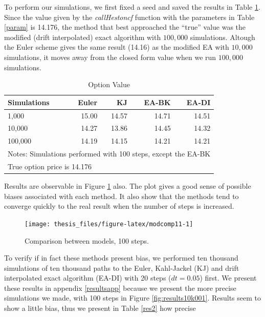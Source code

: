 \documentclass[12pt,oneside]{reedthesis}
\theoremstyle{definition}
\theoremstyle{definition}
\theoremstyle{remark}
\begin{document}
  To perform our simulations, we first fixed a seed and saved the results
  in Table \ref{res}. Since the value given by the \emph{callHestoncf}
  function with the parameters in Table \ref{param} is 14.176, the method
  that best approached the ``true'' value was the modified (drift
  interpolated) exact algorithm with \(100,000\) simulations. Altough the
  Euler scheme gives the same result (14.16) as the modified EA with
  \(10,000\) simulations, it moves away from the closed form value when we
  run \(100,000\) simulations.
  \begin{table}[ht]
  \centering
  \begin{tabular}{lrrrr}
    \hline 
  Simulations & Euler & KJ & EA-BK & EA-DI \\ 
    \hline 
  1,000 & 15.00 & 14.57 & 14.71 & 14.51 \\ 
    10,000 & 14.27 & 13.86 & 14.45 & 14.32 \\ 
    100,000 & 14.19 & 14.15 & 14.21 & 14.21 \\ 
     \hline 
  \multicolumn{5}{l}{\scriptsize{Notes: Simulations performed with 100 steps, except the EA-BK}} \\ 
   \multicolumn{5}{l}{\hspace{0.8cm} \scriptsize{True option price is 14.176}} 
  \end{tabular}
  \caption{Option Value} 
  \label{res}
  \end{table}
  Results are observable in Figure \ref{fig:modcomp11} also. The plot
  gives a good sense of possible biases associated with each method. It
  also show that the methods tend to converge quickly to the real result
  when the number of steps is increased.
  \begin{figure}
  
  {\centering \texttt{[image: thesis\_files/figure-latex/modcomp11-1]} 
  
  }
  
  \caption{Comparison between models, 100 steps. \label{modcomp1}}\label{fig:modcomp11}
  \end{figure}
  To verify if in fact these methods present bias, we performed ten
  thousand simulations of ten thousand paths to the Euler, Kahl-Jackel
  (KJ) and drift interpolated exact algorithm (EA-DI) with 20 steps
  (\(dt = 0.05\)) first. We present these results in appendix
  \ref{resultsapp} because we present the more precise simulations we
  made, with 100 steps in Figure \ref{fig:results10k001}. Results seem to
  show a little bias, thus we present in Table \ref{res2} how precise
\end{document}
